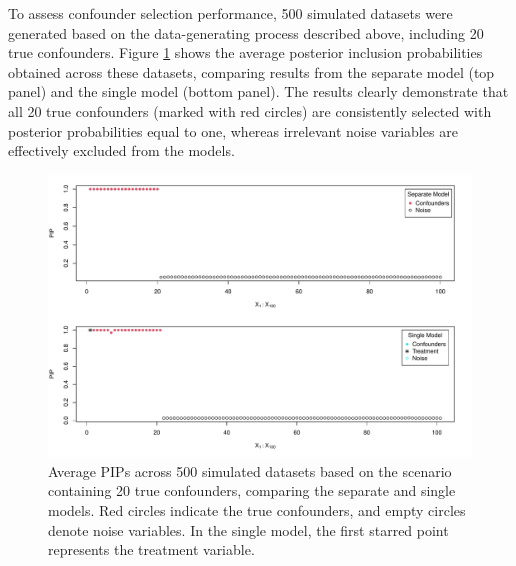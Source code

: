 To assess confounder selection performance, 500 simulated datasets were generated based on the data-generating process described above, including 20 true confounders. Figure \ref{Fig:A2} shows the average posterior inclusion probabilities obtained across these datasets, comparing results from the separate model (top panel) and the single model (bottom panel). The results clearly demonstrate that all 20 true confounders (marked with red circles) are consistently selected with posterior probabilities equal to one, whereas irrelevant noise variables are effectively excluded from the models.
\begin{figure}[htbp]
\includegraphics[width=\linewidth]{fig/pip_s2.pdf}
\caption{Average PIPs across 500 simulated datasets based on the scenario containing 20 true confounders, comparing the separate and single models. Red circles indicate the true confounders, and empty circles denote noise variables. In the single model, the first starred point represents the treatment variable.} \label{Fig:A2}
\end{figure}


